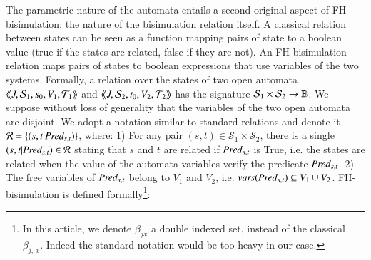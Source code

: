 \documentclass{elsarticle}
\begin{document}
The parametric nature of the automata entails a second original aspect of FH-bisimulation: the nature of the bisimulation relation itself.
 A classical relation between states can be seen as a function mapping pairs of state to a boolean value (true if the states are related, false if they are not). An FH-bisimulation relation maps pairs of states to boolean expressions that use variables of the two systems.  %
Formally, a relation over the states of two open automata  $\langle\hspace{-0.45ex}\langle J,\mathcal{S}_1, s_0,V_1,
   \mathcal{T}_1 \rangle\hspace{-0.45ex}\rangle$ and $\langle\hspace{-0.45ex}\langle J,\mathcal{S}_2,t_0,V_2, \mathcal{T}_2 \rangle\hspace{-0.45ex}\rangle$ has the signature $\mathcal{S}_1\times\mathcal{S}_2\to\mathbb{B}$. 
We suppose without loss of generality that the variables of the two open automata are disjoint.
We adopt a notation similar to standard relations and denote it
 $\mathcal{R}=\{(s,t|\Pred_{s,t})\}$, where: 1) For any pair $(s,t)\in \mathcal{S}_1\times \mathcal{S}_2$, there is a 
   single
      $(s,t|\Pred_{s,t})\in\mathcal{R}$  stating that $s$ and $t$ are related 
      if $\Pred_{s,t}$       is 
      True, i.e. the states are related when the value of the automata variables%
  verify the predicate $\Pred_{s,t}$. 2) The free variables of  $\Pred_{s,t}$ belong to $V_1$ and $V_2$, i.e. $\vars(\Pred_{s,t})\subseteq V_1\cup V_2$.
 FH-bisimulation is defined formally\footnote{In this article, we denote $\beta_{j x}$  a double indexed set, instead of the classical $\beta_{j,\, x}$. Indeed the standard notation would be too heavy in our case.}: 
\end{document}
